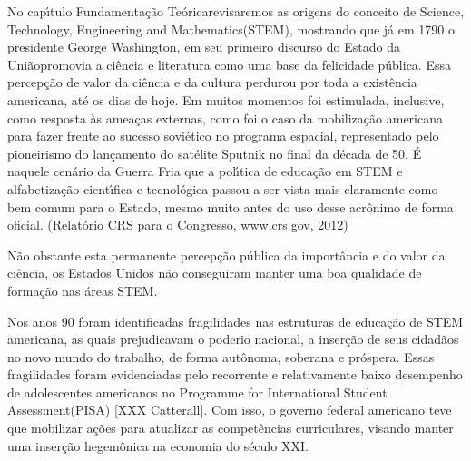 \documentclass[
12pt,		%
openright,	%
twoside,  %
a4paper,			%
chapter=TITLE,		%
english,			%
french,				%
spanish,			%
brazil				%
]{USPSC-classe/USPSC}
\begin{document}
No cap\'{\i}tulo \textquotedbl Fundamenta\c{c}\~ao Te\'orica\textquotedbl  revisaremos as origens do conceito de \textquotedbl Science, Technology, Engineering and Mathematics\textquotedbl  (STEM), mostrando que j\'a em 1790 o presidente George Washington, em seu primeiro discurso do \textquotedbl Estado da Uni\~ao\textquotedbl  promovia a ci\^encia e literatura como uma base da \textquotedbl felicidade p\'ublica\textquotedbl  [XXX]. Essa percep\c{c}\~ao de valor da ci\^encia e da cultura perdurou por toda a exist\^encia americana, at\'e os dias de hoje. Em muitos momentos foi estimulada, inclusive, como resposta \`as amea\c{c}as externas, como foi o caso da mobiliza\c{c}\~ao americana para fazer frente ao sucesso sovi\'etico no programa espacial, representado pelo pioneirismo do lan\c{c}amento do sat\'elite Sputnik no final da d\'ecada de 50. \'E naquele cen\'ario da Guerra Fria que a pol\'{\i}tica de educa\c{c}\~ao em STEM e alfabetiza\c{c}\~ao cient\'{\i}fica e tecnol\'ogica passou a ser vista mais claramente como bem comum para o Estado, mesmo muito antes do uso desse acr\^onimo de forma oficial. (Relat\'orio CRS para o Congresso, www.crs.gov, 2012)










N\~ao obstante esta permanente percep\c{c}\~ao p\'ublica da import\^ancia e do valor da ci\^encia, os Estados Unidos n\~ao conseguiram manter uma boa qualidade de forma\c{c}\~ao nas \'areas STEM.










Nos anos 90 foram identificadas fragilidades nas estruturas de educa\c{c}\~ao de STEM americana, as quais prejudicavam  o \textquotedbl poderio nacional\textquotedbl , a inser\c{c}\~ao de seus cidad\~aos no novo mundo do trabalho, de forma aut\^onoma, soberana  e pr\'ospera. Essas fragilidades foram evidenciadas pelo recorrente e relativamente baixo desempenho de adolescentes americanos no \textquotedbl Programme for International Student Assessment\textquotedbl  (PISA) [XXX Catterall]. Com isso, o governo federal americano teve que mobilizar a\c{c}\~oes para atualizar as compet\^encias curriculares, visando manter uma inser\c{c}\~ao hegem\^onica na economia do s\'eculo XXI.
\end{document}
